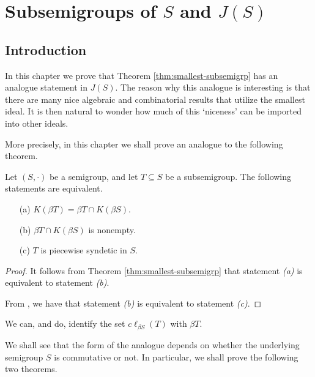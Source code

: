 
\chapter{Subsemigroups of $S$ and $J(S)$}
\section{Introduction}
In this chapter we prove that Theorem \ref{thm:smallest-subsemigrp} has an analogue statement in $J(S)$. 
The reason why this analogue is interesting is that there are many nice algebraic and combinatorial results that utilize the smallest ideal.%
It is then natural to wonder how much of this `niceness' can be imported into other ideals.

More precisely, in this chapter we shall prove an analogue to the following theorem.

\begin{thm}
  Let $(S, \cdot)$ be a semigroup, and let $T \subseteq S$ be a subsemigroup.
  The following statements are equivalent.
  \begin{itemize}
    \item[(a)] 
      $K(\beta T) = \beta T \cap K(\beta S)$.
    
    \item[(b)]
      $\beta T \cap K(\beta S)$ is nonempty.

    \item[(c)]
      $T$ is piecewise syndetic in $S$.
  \end{itemize}
\end{thm}
\begin{proof}
  It follows from Theorem \ref{thm:smallest-subsemigrp} that statement \textsl{(a)} is equivalent to statement \textsl{(b)}.
  
 From \cite[Theorem 4.40]{Hindman:1998fk}, we have that statement \textsl{(b)} is equivalent to statement \textsl{(c)}.
\end{proof}
\begin{rmk}
  We can, and do, identify the set $c \ell_{\beta S}(T)$ with $\beta T$. 
\end{rmk}

We shall see that the form of the analogue depends on whether the underlying semigroup $S$ is commutative or not. 
In particular, we shall prove the following two theorems.

